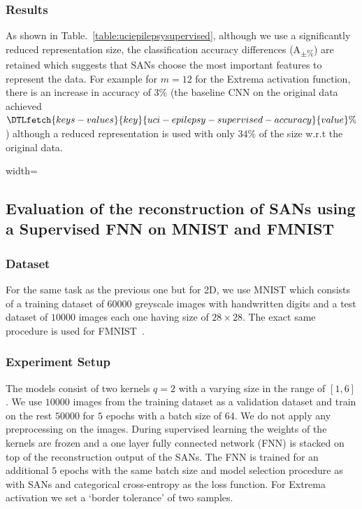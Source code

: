 \documentclass[journal]{IEEEtran}
\providecommand{\FILEPATH}{.}
\begin{document}
\subsubsection{Results}
As shown in Table.~\ref{table:uciepilepsysupervised}, although we use
a significantly reduced representation size, the classification
accuracy differences (A\textsubscript{$\pm$\%}) are retained which
suggests that SANs choose the most important features to represent the data.
For example for $m=12$ for the Extrema activation function, there is
an increase in accuracy of $3\%$ (the baseline CNN on the original
  data achieved
$\DTLfetch{keys-values}{key}{uci-epilepsy-supervised-accuracy}{value}\%$)
although a reduced representation is used with only $34\%$ of the
size w.r.t the original data.
\begin{table}[!t]
  \centering
  \caption{SANs with supervised stacked CNN for UCI-epilepsy
  Classification}\label{table:uciepilepsysupervised}
  \begin{adjustbox}{width=\textwidth}
    
  \end{adjustbox}
\end{table}
\subsection{Evaluation of the reconstruction of SANs using a
Supervised FNN on MNIST and FMNIST}
\subsubsection{Dataset}
For the same task as the previous one but for 2D, we use MNIST which
consists of a training dataset of $60000$ greyscale images with
handwritten digits and a test dataset of $10000$ images each one
having size of $28\times 28$.
The exact same procedure is used for FMNIST~\cite{xiao2017fashion}.
\subsubsection{Experiment Setup}
The models consist of two kernels $q=2$ with a varying size in the
range of $[1, 6]$.
We use $10000$ images from the training dataset as a validation
dataset and train on the rest $50000$ for $5$ epochs with a batch size of $64$.
We do not apply any preprocessing on the images.
During supervised learning the weights of the kernels are frozen and
a one layer fully connected network (FNN) is stacked on top of the
reconstruction output of the SANs.
The FNN is trained for an additional $5$ epochs with the same batch
size and model selection procedure as with SANs and categorical
cross-entropy as the loss function.
For Extrema activation we set a `border tolerance' of two samples.
\end{document}
